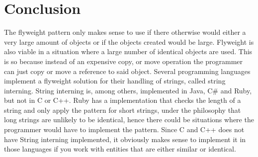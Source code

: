 \section{Conclusion}
The flyweight pattern only makes sense to use if there otherwise would either a very large amount of objects or if the objects created would be large.
Flyweight is also viable in a situation where a large number of identical objects are used. This is so because instead of an expensive copy, or move operation the programmer can just copy or move a reference to said object.
Several programming languages implement a flyweight solution for their handling of strings, called string interning.
String interning is, among others, implemented in Java, C\# and Ruby, but not in C or C++. Ruby has a implementation that checks the length of a string and only apply the pattern for short strings, under the philosophy that long strings are unlikely to be identical, hence there could be situations where the programmer would have to implement the pattern.
Since C and C++ does not have String interning implemented, it obviously makes sense to implement it in those languages if you work with entities that are either similar or identical.